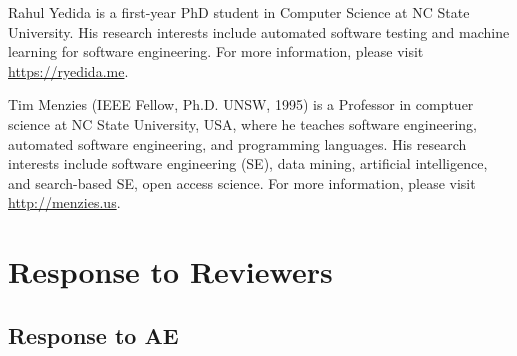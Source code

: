 \documentclass[10pt,compsoc,twocolumn]{IEEEtran}
\begin{document}
\balance

 

\begin{minipage}{.5\textwidth}
\begin{IEEEbiography}{Rahul Yedida} is a first-year PhD student in Computer Science at NC State University. His research interests include automated software testing and machine learning for software engineering. For more information, please visit \url{https://ryedida.me}.
\end{IEEEbiography}
 

\begin{IEEEbiography}{Tim Menzies} (IEEE Fellow, Ph.D. UNSW, 1995)
is a Professor in comptuer science  at NC State University, USA,  
where he teaches software engineering,
automated software engineering,
and programming languages.
His research interests include software engineering (SE), data mining, artificial intelligence, and search-based SE, open access science. 
For more information,  please visit \url{http://menzies.us}.
\end{IEEEbiography}
\end{minipage}


\appendices 
\clearpage

\setcounter{page}{1}
\normalsize
\twocolumn
\section*{Response to Reviewers}
\subsection*{Response to AE}
\end{document}
